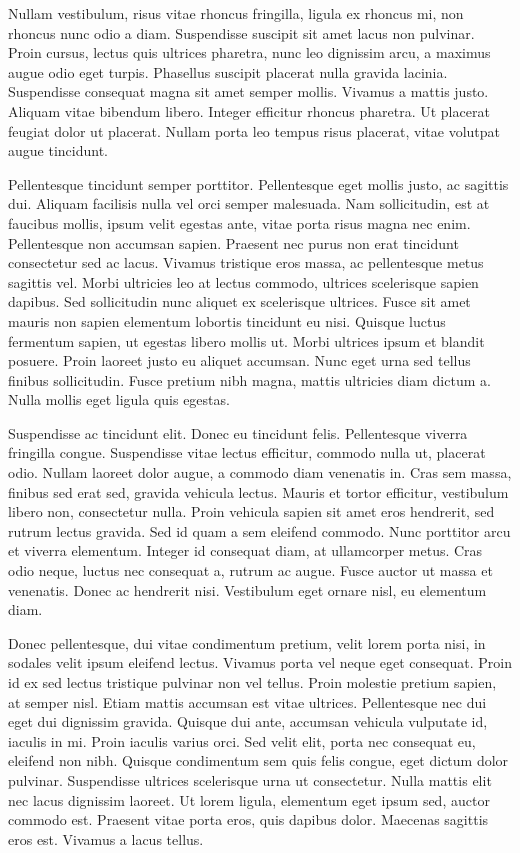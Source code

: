 Nullam vestibulum, risus vitae rhoncus fringilla, ligula ex rhoncus mi, non rhoncus nunc odio a diam.
Suspendisse suscipit sit amet lacus non pulvinar.
Proin cursus, lectus quis ultrices pharetra, nunc leo dignissim arcu, a maximus augue odio eget turpis.
Phasellus suscipit placerat nulla gravida lacinia.
Suspendisse consequat magna sit amet semper mollis.
Vivamus a mattis justo.
Aliquam vitae bibendum libero.
Integer efficitur rhoncus pharetra.
Ut placerat feugiat dolor ut placerat.
Nullam porta leo tempus risus placerat, vitae volutpat augue tincidunt.

Pellentesque tincidunt semper porttitor.
Pellentesque eget mollis justo, ac sagittis dui.
Aliquam facilisis nulla vel orci semper malesuada.
Nam sollicitudin, est at faucibus mollis, ipsum velit egestas ante, vitae porta risus magna nec enim.
Pellentesque non accumsan sapien.
Praesent nec purus non erat tincidunt consectetur sed ac lacus.
Vivamus tristique eros massa, ac pellentesque metus sagittis vel.
Morbi ultricies leo at lectus commodo, ultrices scelerisque sapien dapibus.
Sed sollicitudin nunc aliquet ex scelerisque ultrices.
Fusce sit amet mauris non sapien elementum lobortis tincidunt eu nisi.
Quisque luctus fermentum sapien, ut egestas libero mollis ut.
Morbi ultrices ipsum et blandit posuere.
Proin laoreet justo eu aliquet accumsan.
Nunc eget urna sed tellus finibus sollicitudin.
Fusce pretium nibh magna, mattis ultricies diam dictum a.
Nulla mollis eget ligula quis egestas.

Suspendisse ac tincidunt elit.
Donec eu tincidunt felis.
Pellentesque viverra fringilla congue.
Suspendisse vitae lectus efficitur, commodo nulla ut, placerat odio.
Nullam laoreet dolor augue, a commodo diam venenatis in.
Cras sem massa, finibus sed erat sed, gravida vehicula lectus.
Mauris et tortor efficitur, vestibulum libero non, consectetur nulla.
Proin vehicula sapien sit amet eros hendrerit, sed rutrum lectus gravida.
Sed id quam a sem eleifend commodo.
Nunc porttitor arcu et viverra elementum.
Integer id consequat diam, at ullamcorper metus.
Cras odio neque, luctus nec consequat a, rutrum ac augue.
Fusce auctor ut massa et venenatis.
Donec ac hendrerit nisi.
Vestibulum eget ornare nisl, eu elementum diam.

Donec pellentesque, dui vitae condimentum pretium, velit lorem porta nisi, in sodales velit ipsum eleifend lectus.
Vivamus porta vel neque eget consequat.
Proin id ex sed lectus tristique pulvinar non vel tellus.
Proin molestie pretium sapien, at semper nisl.
Etiam mattis accumsan est vitae ultrices.
Pellentesque nec dui eget dui dignissim gravida.
Quisque dui ante, accumsan vehicula vulputate id, iaculis in mi.
Proin iaculis varius orci.
Sed velit elit, porta nec consequat eu, eleifend non nibh.
Quisque condimentum sem quis felis congue, eget dictum dolor pulvinar.
Suspendisse ultrices scelerisque urna ut consectetur.
Nulla mattis elit nec lacus dignissim laoreet.
Ut lorem ligula, elementum eget ipsum sed, auctor commodo est.
Praesent vitae porta eros, quis dapibus dolor.
Maecenas sagittis eros est.
Vivamus a lacus tellus.

